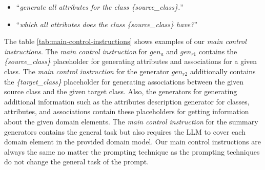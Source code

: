 \begin{itemize}
\item ``\textit{generate all attributes for the class \{source\_class\}.}''
\item ``\textit{which all attributes does the class \{source\_class\} have?}''
\end{itemize}

The table \ref{tab:main-control-instructions} shows examples of our \emph{main control instructions}. The \emph{main control instruction} for $gen_a$ and $gen_{r1}$ contains the \textit{\{source\_class\}} placeholder for generating attributes and associations for a given class. The \emph{main control instruction} for the generator $gen_{r2}$ additionally contains the \textit{\{target\_class\}} placeholder for generating associations between the given source class and the given target class. Also, the generators for generating additional information such as the attributes description generator for classes, attributes, and associations contain these placeholders for getting information about the given domain elements. The \emph{main control instruction} for the summary generators contains the general task but also requires the LLM to cover each domain element in the provided domain model.
Our main control instructions are always the same no matter the prompting technique as the prompting techniques do not change the general task of the prompt.


